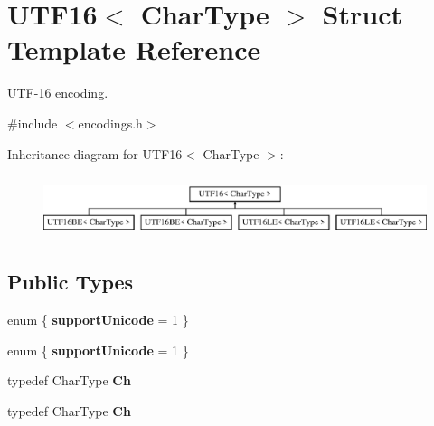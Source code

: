 \hypertarget{struct_u_t_f16}{}\section{U\+T\+F16$<$ Char\+Type $>$ Struct Template Reference}
\label{struct_u_t_f16}


U\+T\+F-\/16 encoding.  




{\ttfamily \#include $<$encodings.\+h$>$}

Inheritance diagram for U\+T\+F16$<$ Char\+Type $>$\+:\begin{figure}[H]
\begin{center}
\leavevmode
\includegraphics[height=1.830065cm]{struct_u_t_f16}
\end{center}
\end{figure}
\subsection*{Public Types}
\begin{DoxyCompactItemize}
\item 
enum \{ {\bfseries support\+Unicode} = 1
 \}\hypertarget{struct_u_t_f16_a286def80fa945e4d43d52fd398f981da}{}\label{struct_u_t_f16_a286def80fa945e4d43d52fd398f981da}

\item 
enum \{ {\bfseries support\+Unicode} = 1
 \}\hypertarget{struct_u_t_f16_a51f63a9fd1501bee27bbd4d2a1e57ead}{}\label{struct_u_t_f16_a51f63a9fd1501bee27bbd4d2a1e57ead}

\item 
typedef Char\+Type {\bfseries Ch}\hypertarget{struct_u_t_f16_a811680d50447c98be4fd94c0a27504bb}{}\label{struct_u_t_f16_a811680d50447c98be4fd94c0a27504bb}

\item 
typedef Char\+Type {\bfseries Ch}\hypertarget{struct_u_t_f16_a811680d50447c98be4fd94c0a27504bb}{}\label{struct_u_t_f16_a811680d50447c98be4fd94c0a27504bb}

\end{DoxyCompactItemize}
